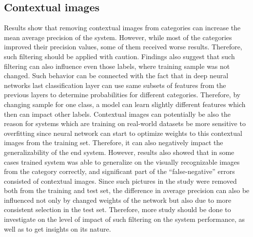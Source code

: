 \subsection{Contextual images}
Results show that removing contextual images from categories can increase the mean average precision of the system. However, while most of the categories improved their precision values, some of them received worse results. Therefore, such filtering should be applied with caution. Findings also suggest that such filtering can also influence even those labels, where training sample was not changed. Such behavior can be connected with the fact that in deep neural networks last classification layer can use same subsets of features from the previous layers to determine probabilities for different categories. Therefore, by changing sample for one class, a model can learn slightly different features which then can impact other labels.  Contextual images can potentially be also the reason for systems which are training on real-world datasets be more sensitive to overfitting since neural network can start to optimize weights to this contextual images from the training set. Therefore, it can also negatively impact the generalizability of the end system. However, results also showed that in some cases trained system was able to generalize on the visually recognizable images from the category correctly, and significant part of the ``false-negative'' errors consisted of contextual images. Since such pictures in the study were removed both from the training and test set, the difference in average precision can also be influenced not only by changed weights of the network but also due to more consistent selection in the test set. Therefore, more study should be done to investigate on the level of impact of such filtering on the system performance, as well as to get insights on its nature.

